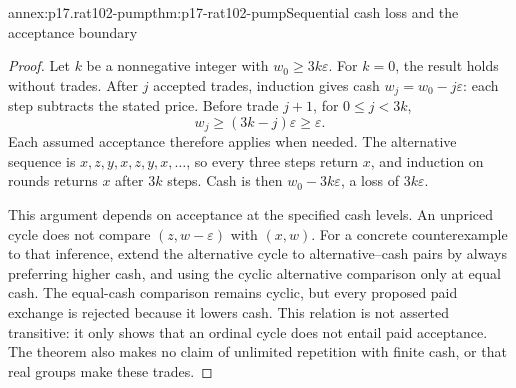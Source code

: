 \begin{annexitem}{annex:p17.rat102-pump}{thm:p17-rat102-pump}{Sequential cash loss and the acceptance boundary}
\begin{proof}
Let \(k\) be a nonnegative integer with \(w_0\geq3k\varepsilon\).
For \(k=0\), the result holds without trades. After \(j\) accepted
trades, induction gives cash \(w_j=w_0-j\varepsilon\): each step
subtracts the stated price. Before trade \(j+1\), for
\(0\leq j<3k\),
\[
             w_j\geq(3k-j)\varepsilon\geq\varepsilon.
\]
Each assumed acceptance therefore applies when needed. The alternative
sequence is \(x,z,y,x,z,y,x,\ldots\), so every three steps return
\(x\), and induction on rounds returns \(x\) after \(3k\) steps.
Cash is then \(w_0-3k\varepsilon\), a loss of \(3k\varepsilon\).

This argument depends on acceptance at the specified cash levels. An
unpriced cycle does not compare \((z,w-\varepsilon)\) with \((x,w)\).
For a concrete counterexample to that inference, extend the alternative
cycle to alternative--cash pairs by always preferring higher cash, and
using the cyclic alternative comparison only at equal cash. The equal-cash
comparison remains cyclic, but every proposed paid exchange is rejected
because it lowers cash. This relation is not asserted transitive: it only
shows that an ordinal cycle does not entail paid acceptance. The theorem
also makes no claim of unlimited repetition with finite cash, or that
real groups make these trades.
\end{proof}
\end{annexitem}

